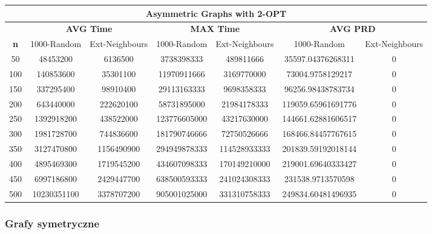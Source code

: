 \documentclass{article}
\begin{document}
\begin{center}
\begin{tabular}{|c|c|c|c|c|c|c|}
\hline
\multicolumn{7}{|c|}{\textbf{Asymmetric Graphs with 2-OPT}}\\
\hline
 & \multicolumn{2}{|c|}{\textbf{AVG Time}} & \multicolumn{2}{|c|}{\textbf{MAX Time}} & \multicolumn{2}{|c|}{\textbf{AVG PRD}}\\
\hline
\textbf{n} & 1000-Random & Ext-Neighbours & 1000-Random & Ext-Neighbours & 1000-Random & Ext-Neighbours\\
\hline
50 & 48453200 & 6136500 & 3738398333 & 489811666 & 35597.04376268311 & 0\\
\hline
100 & 140853600 & 35301100 & 11970911666 & 3169770000 & 73004.9758129217 & 0\\
\hline
150 & 337295400 & 98910400 & 29113163333 & 9698358333 & 96256.98438783734 & 0\\
\hline
200 & 643440000 & 222620100 & 58731895000 & 21984178333 & 119059.65961691776 & 0\\
\hline
250 & 1392918200 & 438522000 & 123776605000 & 43217630000 & 144661.62881606517 & 0\\
\hline
300 & 1981728700 & 744836600 & 181790746666 & 72750526666 & 168466.84457767615 & 0\\
\hline
350 & 3127470800 & 1156490900 & 294949878333 & 114528933333 & 201839.59192018144 & 0\\
\hline
400 & 4895469300 & 1719545200 & 434607098333 & 170149210000 & 219001.69640333427 & 0\\
\hline
450 & 6997186800 & 2429447700 & 638500593333 & 241024308333 & 231538.9713570598 & 0\\
\hline
500 & 10230351100 & 3378707200 & 905001025000 & 331310758333 & 249834.60481496935 & 0\\
\hline
\end{tabular}
\end{center}


\subsubsection{Grafy symetryczne}
\end{document}

